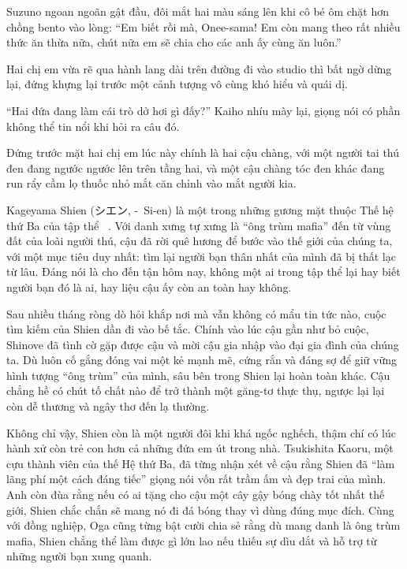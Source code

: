 \documentclass[../main.tex]{subfiles}
\begin{document}
Suzuno ngoan ngoãn gật đầu, đôi mắt hai màu sáng lên khi cô bé ôm chặt hơn chồng bento vào lòng: ``Em biết rồi mà, Onee-sama! Em còn mang theo rất nhiều thức ăn thừa nữa, chút nữa em sẽ chia cho các anh ấy cùng ăn luôn.''

Hai chị em vừa rẽ qua hành lang dài trên đường đi vào studio thì bất ngờ dừng lại, đứng khựng lại trước một cảnh tượng vô cùng khó hiểu và quái dị.

``Hai đứa đang làm cái trò dở hơi gì đấy?'' Kaiho nhíu mày lại, giọng nói có phần không thể tin nổi khi hỏi ra câu đó.

Đứng trước mặt hai chị em lúc này chính là hai cậu chàng, với một người tai thú đen đang ngước ngước lên trên tầng hai, và một cậu chàng tóc đen khác đang run rẩy cầm lọ thuốc nhỏ mắt căn chỉnh vào mắt người kia.

\chrint


Kageyama Shien (シエン, -\ Si-en) là một trong những gương mặt thuộc Thế hệ thứ Ba của tập thể \hls\ . Với danh xưng tự xưng là ``ông trùm mafia'' đến từ vùng đất của loài người thú, cậu đã rời quê hương để bước vào thế giới của chúng ta, với một mục tiêu duy nhất: tìm lại người bạn thân nhất của mình đã bị thất lạc từ lâu. Đáng nói là cho đến tận hôm nay, không một ai trong tập thể lại hay biết người bạn đó là ai, hay liệu cậu ấy còn an toàn hay không.

Sau nhiều tháng ròng dò hỏi khắp nơi mà vẫn không có mẩu tin tức nào, cuộc tìm kiếm của Shien dần đi vào bế tắc. Chính vào lúc cậu gần như bỏ cuộc, Shinove đã tình cờ gặp được cậu và mời cậu gia nhập vào đại gia đình của chúng ta. Dù luôn cố gắng đóng vai một kẻ mạnh mẽ, cứng rắn và đáng sợ để giữ vững hình tượng ``ông trùm'' của mình, sâu bên trong Shien lại hoàn toàn khác. Cậu chẳng hề có chút tố chất nào để trở thành một găng-tơ thực thụ, ngược lại lại còn dễ thương và ngây thơ đến lạ thường.


Không chỉ vậy, Shien còn là một người đôi khi khá ngốc nghếch, thậm chí có lúc hành xử còn trẻ con hơn cả những đứa em út trong nhà. Tsukishita Kaoru, một cựu thành viên của thế Hệ thứ Ba, đã từng nhận xét về cậu rằng Shien đã ``làm lãng phí một cách đáng tiếc'' giọng nói vốn rất trầm ấm và đẹp trai của mình. Anh còn đùa rằng nếu có ai tặng cho cậu một cây gậy bóng chày tốt nhất thế giới, Shien chắc chắn sẽ mang nó đi đá bóng thay vì dùng đúng mục đích. Cùng với đồng nghiệp, Oga cũng từng bật cười chia sẻ rằng dù mang danh là ông trùm mafia, Shien chẳng thể làm được gì lớn lao nếu thiếu sự dìu dắt và hỗ trợ từ những người bạn xung quanh.
\end{document}
